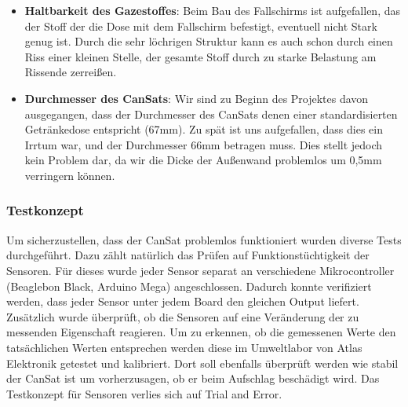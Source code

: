 \begin{itemize}
\item \textbf{Haltbarkeit des Gazestoffes}: Beim Bau des Fallschirms ist aufgefallen, das der Stoff der die Dose mit dem Fallschirm befestigt, eventuell nicht Stark genug ist. Durch die sehr löchrigen Struktur kann es auch schon durch einen Riss einer kleinen Stelle, der gesamte Stoff durch zu starke Belastung am Rissende zerreißen.
\item \textbf{Durchmesser des CanSats}: Wir sind zu Beginn des Projektes davon ausgegangen, dass der Durchmesser des CanSats denen einer standardisierten Getränkedose entspricht (67mm). Zu spät ist uns aufgefallen, dass dies ein Irrtum war, und der Durchmesser 66mm betragen muss. Dies stellt jedoch kein Problem dar, da wir die Dicke der Außenwand problemlos um 0,5mm verringern können.
\end{itemize}

\subsubsection{Testkonzept}

Um sicherzustellen, dass der CanSat problemlos funktioniert wurden diverse Tests durchgeführt. Dazu zählt natürlich das Prüfen auf Funktionstüchtigkeit der Sensoren. Für dieses wurde jeder Sensor separat an verschiedene Mikrocontroller (Beaglebon Black, Arduino Mega) angeschlossen. Dadurch konnte verifiziert werden, dass jeder Sensor unter jedem Board den gleichen Output liefert. Zusätzlich wurde überprüft, ob die Sensoren auf eine Veränderung der zu messenden Eigenschaft reagieren. Um zu erkennen, ob die gemessenen Werte den tatsächlichen Werten entsprechen werden diese im Umweltlabor von Atlas Elektronik getestet und kalibriert. Dort soll ebenfalls überprüft werden wie stabil der CanSat ist um vorherzusagen, ob er beim Aufschlag beschädigt wird. Das Testkonzept für Sensoren verlies sich auf Trial and Error.